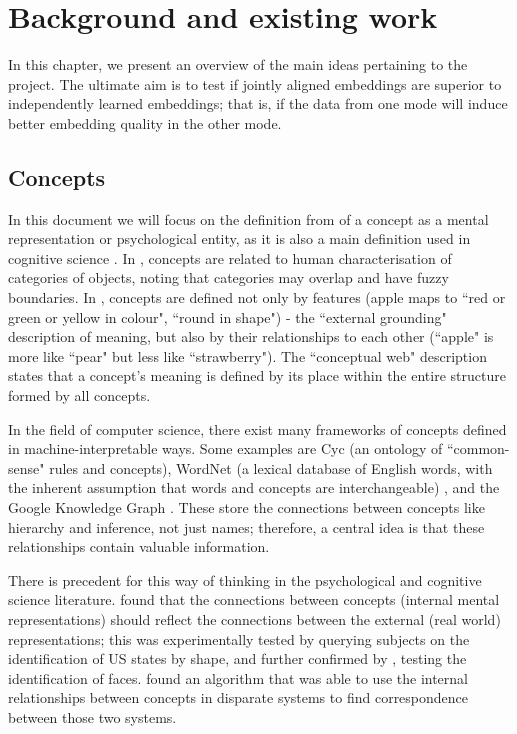 
\chapter{Background and existing work}

In this chapter, we present an overview of the main ideas pertaining to the project. The ultimate aim is to test if jointly aligned embeddings are superior to independently learned embeddings; that is, if the data from one mode will induce better embedding quality in the other mode. 

\section{Concepts}

In this document we will focus on the definition from \cite{stanfordconcepts} of a concept as a mental representation or psychological entity, as it is also a main definition used in cognitive science \cite{Pinker2007}. In \cite{NatureOfHumanConcepts}, concepts are related to human characterisation of categories of objects, noting that categories may overlap and have fuzzy boundaries. In \cite{GOLDSTONE2002295}, concepts are defined not only by features (apple maps to ``red or green or yellow in colour", ``round in shape") - the ``external grounding" description of meaning, but also by their relationships to each other (``apple" is more like ``pear" but less like ``strawberry"). The ``conceptual web" description states that a concept's meaning is defined by its place within the entire structure formed by all concepts. 

In the field of computer science, there exist many frameworks of concepts defined in machine-interpretable ways. Some examples are Cyc \cite{Cyc} (an ontology of ``common-sense" rules and concepts), WordNet (a lexical database of English words, with the inherent assumption that words and concepts are interchangeable) \cite{WordNet}, and the Google Knowledge Graph \cite{KnowledgeGraphs}. These store the connections between concepts like hierarchy and inference, not just names; therefore, a central idea is that these relationships contain valuable information. 

There is precedent for this way of thinking in the psychological and cognitive science literature. \cite{SHEPARD19701} found that the connections between concepts (internal mental representations) should reflect the connections between the external (real world) representations; this was experimentally tested by querying subjects on the identification of US states by shape, and further confirmed by \cite{SecondOrderIsomorphismFaces}, testing the identification of faces. \cite{GOLDSTONE2002295} found an algorithm that was able to use the internal relationships between concepts in disparate systems to find correspondence between those two systems. 


